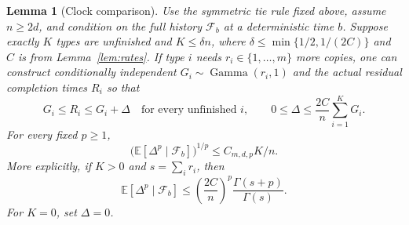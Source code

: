 \documentclass[11pt]{article}
\newtheorem{lemma}[theorem]{Lemma}
\theoremstyle{remark}\newtheorem{remark}[theorem]{Remark}
\newcommand{\Ebb}{\mathbb E}
\newcommand{\Fcal}{\mathcal F}
\begin{document}
\begin{lemma}[Clock comparison]\label{lem:clock}
Use the symmetric tie rule fixed above, assume $n\ge2d$, and condition on
the full history $\Fcal_b$ at a deterministic time $b$. Suppose exactly $K$
types are unfinished and $K\le\delta n$, where
$\delta\le\min\{1/2,1/(2C)\}$ and $C$ is from Lemma~\ref{lem:rates}.
If type $i$ needs $r_i\in\{1,\ldots,m\}$ more copies, one can construct
conditionally independent $G_i\sim\operatorname{Gamma}(r_i,1)$ and the
actual residual completion times $R_i$ so that
\begin{equation}\label{eq:clockcoupling}
 G_i\le R_i\le G_i+\Delta\quad\text{for every unfinished }i,
 \qquad 0\le\Delta\le\frac{2C}{n}\sum_{i=1}^K G_i.
\end{equation}
For every fixed $p\ge1$,
\begin{equation}\label{eq:clockmoment}
 \bigl(\Ebb[\Delta^p\mid\Fcal_b]\bigr)^{1/p}
 \le C_{m,d,p}K/n.
\end{equation}
More explicitly, if $K>0$ and $s=\sum_i r_i$, then
\begin{equation}\label{eq:clockexplicit}
 \Ebb[\Delta^p\mid\Fcal_b]
 \le\left(\frac{2C}{n}\right)^p\frac{\Gamma(s+p)}{\Gamma(s)}.
\end{equation}
For $K=0$, set $\Delta=0$.
\end{lemma}
\end{document}
